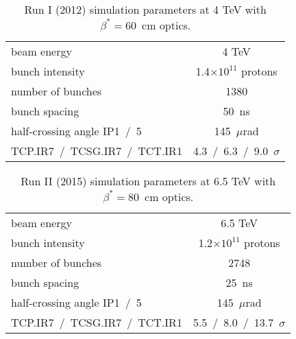 
\begin{table}
   \centering
   \caption{Run I (2012) simulation parameters at 4 TeV with $\beta^* = 60$~cm optics.}
   \begin{tabular}{l|c}
       \hline
       beam energy & 4 TeV \\
       bunch intensity & 1.4$\times 10^{11}$ protons\\
       number of bunches & 1380 \\
       bunch spacing & 50~ns \\
       half-crossing angle IP1~/~5 & 145~$\mu$rad \\
       TCP.IR7~/~TCSG.IR7~/~TCT.IR1 & 4.3~/~6.3~/~9.0~$\sigma$ \\
       \hline
   \end{tabular}
   \label{paramsRun1}
\end{table}

\begin{table}
   \centering
   \caption{Run II (2015) simulation parameters at 6.5 TeV with $\beta^* = 80$~cm optics.}
   \begin{tabular}{l|c}
       \hline
       beam energy & 6.5 TeV \\
       bunch intensity & 1.2$\times 10^{11}$ protons\\
       number of bunches & 2748 \\
       bunch spacing & 25~ns \\
       half-crossing angle IP1~/~5 & 145~$\mu$rad \\
       TCP.IR7~/~TCSG.IR7~/~TCT.IR1 & 5.5~/~8.0~/~13.7~$\sigma$ \\
       \hline
   \end{tabular}
   \label{paramsRun2}
\end{table}


